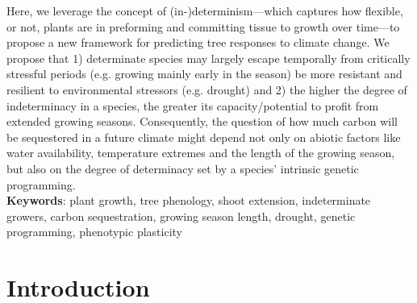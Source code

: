 \documentclass{article}
\begin{document}
		Here, we leverage the concept of (in-)determinism---which captures how flexible, or not, plants are in preforming and committing tissue to growth over time---to propose a new framework for predicting tree responses to climate change. We propose that 1) determinate species may largely escape temporally from critically stressful periods (e.g. growing mainly early in the season) be more resistant and resilient to environmental stressors (e.g. drought) and 2) the higher the degree of indeterminacy in a species, the greater its capacity/potential to profit from extended growing seasons. Consequently, the question of how much carbon will be sequestered in a future climate might depend not only on abiotic factors like water availability, temperature extremes and the length of the growing season, but also on the degree of determinacy set by a species' intrinsic genetic programming.\\
		
			\textbf{Keywords}: plant growth, tree phenology, shoot extension, indeterminate growers, carbon sequestration, growing season length, drought, genetic programming, phenotypic plasticity
			\newpage
			
\section*{Introduction}
	
\end{document}
